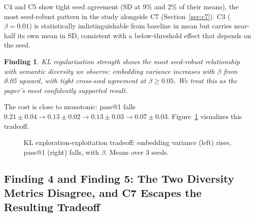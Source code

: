 \documentclass{article}
\newtheorem{finding}{Finding}
\begin{document}
C4 and C5 show tight seed agreement (SD at 9\% and 2\% of their means), the most seed-robust pattern in the study alongside C7 (Section~\ref{sec:c7}). C3 ($\beta=0.01$) is statistically indistinguishable from baseline in mean but carries near-half its own mean in SD, consistent with a below-threshold effect that depends on the seed.

\begin{finding}
\label{find:klmono}
KL regularization strength shows the most seed-robust relationship with semantic diversity we observe: embedding variance increases with $\beta$ from 0.05 upward, with tight cross-seed agreement at $\beta \geq 0.05$. We treat this as the paper's most confidently supported result.
\end{finding}

The cost is close to monotonic: pass@1 falls $0.21\pm0.04 \rightarrow 0.13\pm0.02 \rightarrow 0.13\pm0.03 \rightarrow 0.07\pm0.03$. Figure~\ref{fig:kl_tradeoff} visualizes this tradeoff.

\begin{figure}[t]
\centering
{}
\caption{KL exploration-exploitation tradeoff: embedding variance (left) rises, pass@1 (right) falls, with $\beta$. Means over 3 seeds.}
\label{fig:kl_tradeoff}
\end{figure}

\subsection{Finding 4 and Finding 5: The Two Diversity Metrics Disagree, and C7 Escapes the Resulting Tradeoff}
\label{sec:metricdivergence}
\end{document}

